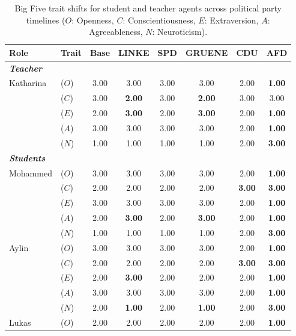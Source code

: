 \begin{table}[t]
\centering
\caption{Big Five trait shifts for student and teacher agents across political party timelines ($O$: Openness, $C$: Conscientiousness, $E$: Extraversion, $A$: Agreeableness, $N$: Neuroticism).}
\label{tab:agent_shifts}
\small
\setlength{\tabcolsep}{6pt}
\begin{tabular}{llcccccc}
\toprule
\textbf{Role} & \textbf{Trait} & \textbf{Base} & \textbf{LINKE} & \textbf{SPD} & \textbf{GRUENE} & \textbf{CDU} & \textbf{AFD} \\
\midrule
\multicolumn{8}{l}{\textit{\textbf{Teacher}}} \\
Katharina & ($O$) & 3.00 & 3.00 & 3.00 & 3.00 & 2.00 & \textbf{1.00} \\
          & ($C$) & 3.00 & \textbf{2.00} & 3.00 & \textbf{2.00} & 3.00 & 3.00 \\
          & ($E$) & 2.00 & \textbf{3.00} & 2.00 & \textbf{3.00} & 2.00 & \textbf{1.00} \\
          & ($A$) & 3.00 & 3.00 & 3.00 & 3.00 & 2.00 & \textbf{1.00} \\
          & ($N$) & 1.00 & 1.00 & 1.00 & 1.00 & 2.00 & \textbf{3.00} \\
\midrule
\multicolumn{8}{l}{\textit{\textbf{Students}}} \\
Mohammed & ($O$) & 3.00 & 3.00 & 3.00 & 3.00 & 2.00 & \textbf{1.00} \\
         & ($C$) & 2.00 & 2.00 & 2.00 & 2.00 & \textbf{3.00} & \textbf{3.00} \\
         & ($E$) & 3.00 & 3.00 & 3.00 & 3.00 & 2.00 & \textbf{1.00} \\
         & ($A$) & 2.00 & \textbf{3.00} & 2.00 & \textbf{3.00} & 2.00 & \textbf{1.00} \\
         & ($N$) & 1.00 & 1.00 & 1.00 & 1.00 & 2.00 & \textbf{3.00} \\
\addlinespace
Aylin & ($O$) & 3.00 & 3.00 & 3.00 & 3.00 & 2.00 & \textbf{1.00} \\
      & ($C$) & 2.00 & 2.00 & 2.00 & 2.00 & \textbf{3.00} & \textbf{3.00} \\
      & ($E$) & 2.00 & \textbf{3.00} & 2.00 & 2.00 & 2.00 & \textbf{1.00} \\
      & ($A$) & 3.00 & 3.00 & 3.00 & 3.00 & 2.00 & \textbf{1.00} \\
      & ($N$) & 2.00 & \textbf{1.00} & 2.00 & \textbf{1.00} & 2.00 & \textbf{3.00} \\
\addlinespace
Lukas & ($O$) & 2.00 & 2.00 & 2.00 & 2.00 & 2.00 & \textbf{1.00} \\

\end{tabular}
\end{table}
